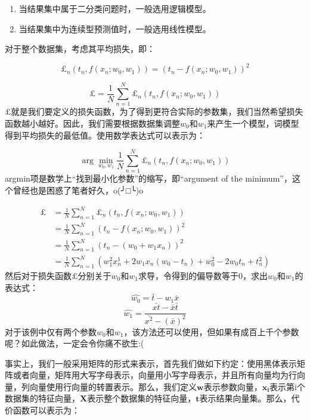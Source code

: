 \documentclass[a4paper, 11pt, hyperref, UTF8]{ctexart} %
\begin{document}
\begin{enumerate}
\item 当结果集中属于二分类问题时，一般选用逻辑模型。
\item 当结果集中为连续型预测值时，一般选用线性模型。
\end{enumerate}

对于整个数据集，考虑其平均损失，即：

$$ \pounds_n(t_n, f(x_n; w_0, w_1)) = (t_n - f(x_n; w_0, w_1))^2 $$

$$ \pounds = \frac{1}{N} \sum_{n=1}^{N}{\pounds_n(t_n, f(x_n; w_0, w_1))}$$
$\pounds$就是我们要定义的损失函数，为了得到更符合实际的参数集，我们当然希望损失函数越小越好。因此，我们需要根据数据集调整$w_0$和$w_1$来产生一个模型，词模型得到平均损失的最低值。使用数学表达式可以表示为：

$$ \arg \min_{w_0,w_1}\frac{1}{N} \sum_{n=1}^{N}{\pounds_n(t_n, f(x_n; w_0, w_1))} $$
argmin项是数学上“找到最小化参数”的缩写，即“argument of the minimum”，这个曾经也是困惑了笔者好久，o(╯□╰)o

\begin{align*}
\pounds &= \frac{1}{N} \sum_{n=1}^{N}{\pounds_n(t_n, f(x_n; w_0, w_1))} \\
        &= \frac{1}{N} \sum_{n=1}^{N}{(t_n - f(x_n; w_0, w_1))}^2 \\
        &= \frac{1}{N} \sum_{n=1}^{N}{(t_n - (w_0 + w_1x_n))}^2 \\
        &= \frac{1}{N} \sum_{n=1}^{N}{(w_1^2x_n^1+2w_1x_n(w_0-t_n)+w_0^2-2w_0t_n+t_n^2)}
\end{align*}
然后对于损失函数$\pounds$分别关于$w_0$和$w_1$求导，令得到的偏导数等于0，求出$w_0$和$w_1$的表达式：
$$ \widehat{w_0} =  \bar{t} - w_1\bar{x}$$
$$ \widehat{w_1} = \frac{\bar{xt} - \bar{x}\bar{t}}{\bar{x^2} - (\bar{x})^2} $$
对于该例中仅有两个参数$w_0$和$w_1$，该方法还可以使用，但如果有成百上千个参数呢？如此做法，一定会令你痛不欲生:(

事实上，我们一般采用矩阵的形式来表示，首先我们做如下约定：使用黑体表示矩阵或者向量，矩阵用大写字母表示，向量用小写字母表示，并且所有向量均为行向量，列向量使用行向量的转置表示。那么，我们定义$\bm{w}$表示参数向量，$\bm{x_i}$表示第i个数据集的特征向量，$\bm{X}$表示整个数据集的特征向量，$\bm{t}$表示结果向量集。那么，代价函数可以表示为：
\end{document}
